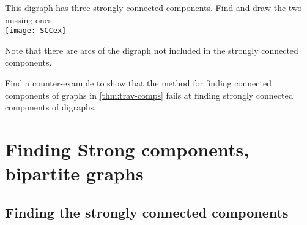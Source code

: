 \begin{Boxample}[0]\label{eg:scc}
This digraph has three strongly connected components. Find and draw the two missing ones.\\

\texttt{[image: SCCex]}

Note that there are arcs of the digraph not included in the strongly connected components.
\end{Boxample}

\begin{Boxample}[4]
Find a counter-example to show that the method for finding connected components of graphs 
in \cref{thm:trav-comps} fails at finding strongly connected components of digraphs.
\end{Boxample}



%
%


\chapter{Finding Strong components, bipartite graphs} %

\section{Finding the strongly connected components}



